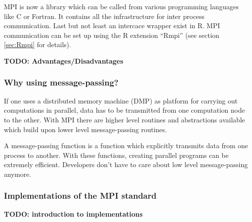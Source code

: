 MPI is now a library which can be called from various programming
languages like C or Fortran. It contains all the infrastructure for
inter process communication. Last but not least an intercace wrapper
exist in R. MPI communication can be set up using the R extension
``Rmpi'' (see section \ref{sec:Rmpi} for details).

\textbf{TODO: Advantages/Disadvantages}

\subsubsection{Why using message-passing?}
\label{sec:why_m-p}

If one uses a distributed memory machine (DMP) as platform for
carrying out computations in parallel, data has to be transmitted from
one computation node to the other. With MPI there are higher level
routines and abstractions available which build upon lower level
message-passing routines.
  
A message-passing function is a function which explicitly transmits
data from one process to another. With these
functions, creating parallel programs can be extremely
efficient. Developers don't have to care about low level
message-passing anymore.

\subsubsection{Implementations of the MPI standard}

\textbf{TODO: introduction to implementations}

